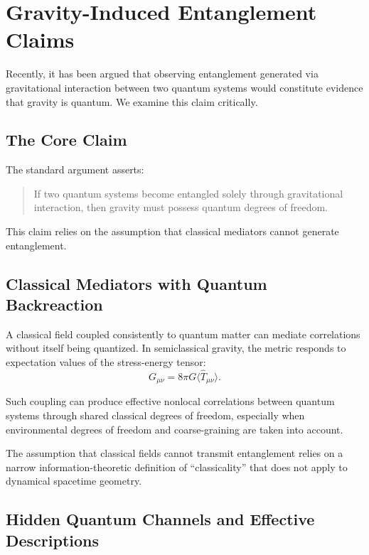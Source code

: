 \documentclass[12pt]{article}
\begin{document}
\section{Gravity-Induced Entanglement Claims}

Recently, it has been argued that observing entanglement generated via
gravitational interaction between two quantum systems would constitute evidence
that gravity is quantum. We examine this claim critically.

\subsection{The Core Claim}

The standard argument asserts:
\begin{quote}
If two quantum systems become entangled solely through gravitational
    interaction, then gravity must possess quantum degrees of freedom.
\end{quote}

This claim relies on the assumption that classical mediators cannot generate
entanglement.

\subsection{Classical Mediators with Quantum Backreaction}

A classical field coupled consistently to quantum matter can mediate
correlations without itself being quantized. In semiclassical gravity, the
metric responds to expectation values of the stress-energy tensor:
\begin{equation}
    G_{\mu\nu} = 8\pi G \langle \hat{T}_{\mu\nu} \rangle.
\end{equation}

Such coupling can produce effective nonlocal correlations between quantum
systems through shared classical degrees of freedom, especially when
environmental degrees of freedom and coarse-graining are taken into account.

The assumption that classical fields cannot transmit entanglement relies on a
narrow information-theoretic definition of ``classicality'' that does not apply
to dynamical spacetime geometry.

\subsection{Hidden Quantum Channels and Effective Descriptions}
\end{document}
